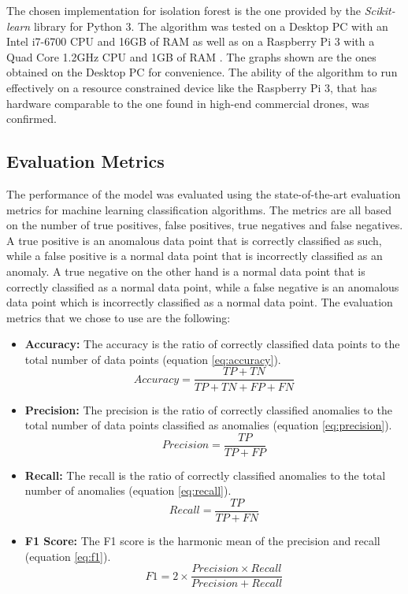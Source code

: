\documentclass[futureinternet,article,submit,pdftex,moreauthors]{Definitions/mdpi}
\begin{document}
The chosen implementation for isolation forest is the one provided by the \textit{Scikit-learn} library \cite{IsolationForestScikitLearn} for Python 3. 
The algorithm was tested on a Desktop PC with an Intel i7-6700 CPU and 16GB of RAM as well as on a Raspberry Pi 3 with a Quad Core 1.2GHz CPU and 1GB of RAM \cite{RaspberryPi3ModelB}.
The graphs shown are the ones obtained on the Desktop PC for convenience. The ability of the algorithm to run effectively on a resource constrained device like the Raspberry Pi 3, that has hardware comparable to the one found in high-end commercial drones, was confirmed. 

\subsection{Evaluation Metrics}\label{EvaluationMetrics}

The performance of the model was evaluated using the state-of-the-art evaluation metrics for machine learning classification algorithms. The metrics are all based on the number of true positives, false positives, true negatives and false negatives. A true positive is an anomalous data point that is correctly classified as such, while a false positive is a normal data point that is incorrectly classified as an anomaly. A true negative on the other hand is a normal data point that is correctly classified as a normal data point, while a false negative is an anomalous data point which is incorrectly classified as a normal data point.
The evaluation metrics that we chose to use are the following: 

\begin{itemize}
	\item \textbf{Accuracy:} The accuracy is the ratio of correctly classified data points to the total number of data points (equation \ref{eq:accuracy}).
	\begin{equation}
		\label{eq:accuracy}
	  Accuracy = \frac{TP + TN}{TP + TN + FP + FN}
	\end{equation}
	\item \textbf{Precision:} The precision is the ratio of correctly classified anomalies to the total number of data points classified as anomalies (equation \ref{eq:precision}).
	\begin{equation}
		\label{eq:precision}
	  Precision = \frac{TP}{TP + FP}
	\end{equation}
	\item \textbf{Recall:} The recall is the ratio of correctly classified anomalies to the total number of anomalies (equation \ref{eq:recall}).
	\begin{equation}
		\label{eq:recall}
	  Recall = \frac{TP}{TP + FN}
	\end{equation}
	\item \textbf{F1 Score:} The F1 score is the harmonic mean of the precision and recall (equation \ref{eq:f1}).
	\begin{equation}
		\label{eq:f1}
	  F1 = 2 \times \frac{Precision \times Recall}{Precision + Recall}
	\end{equation}
\end{itemize}
\end{document}
